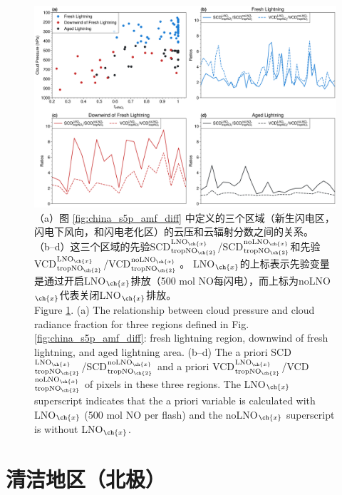 \begin{figure}[H]
    \centering
    \includegraphics[width=\textwidth]{./figures/china_amf_contribution.png}
    \caption{
    （a）图 \ref{fig:china_s5p_amf_diff} 中定义的三个区域（新生闪电区，闪电下风向，和闪电老化区）的云压和云辐射分数之间的关系。
     （b--d）这三个区域的先验SCD$^{\textrm{LNO$_{\ch{x}}$}}_{\textrm{tropNO$_{\ch{2}}$}}$/SCD$^{\textrm{noLNO$_{\ch{x}}$}}_{ \textrm{tropNO$_{\ch{2}}$}}$和先验VCD$^{\textrm{LNO$_{\ch{x}}$}}_{\textrm{tropNO$_{\ch{2}}$}}$/VCD$^{\textrm{noLNO$_{\ch{x}}$ }}_{\textrm{tropNO$_{\ch{2}}$}}$。
     LNO$_{\ch{x}}$的上标表示先验变量是通过开启LNO$_{\ch{x}}$排放（500 mol NO每闪电），而上标为noLNO$_{\ch{x}}$代表关闭LNO$_{\ch{x}}$排放。\\
     Figure \ref{fig:china_amf_contribution}. (a) The relationship between cloud pressure and cloud radiance fraction for three regions defined in Fig. \ref{fig:china_s5p_amf_diff}: fresh lightning region, downwind of fresh lightning, and aged lightning area.
    (b--d) The a priori SCD$^{\textrm{LNO$_{\ch{x}}$}}_{\textrm{tropNO$_{\ch{2}}$}}$/SCD$^{\textrm{noLNO$_{\ch{x}}$}}_{\textrm{tropNO$_{\ch{2}}$}}$ and a priori VCD$^{\textrm{LNO$_{\ch{x}}$}}_{\textrm{tropNO$_{\ch{2}}$}}$/VCD$^{\textrm{noLNO$_{\ch{x}}$}}_{\textrm{tropNO$_{\ch{2}}$}}$ of pixels in these three regions. The LNO$_{\ch{x}}$ superscript indicates that the a priori variable is calculated with LNO$_{\ch{x}}$ (500 mol NO per flash) and the noLNO$_{\ch{x}}$ superscript is without LNO$_{\ch{x}}$.
    }
    \label{fig:china_amf_contribution}
\end{figure}



\section{清洁地区（北极）} \label{sec:arctic}

